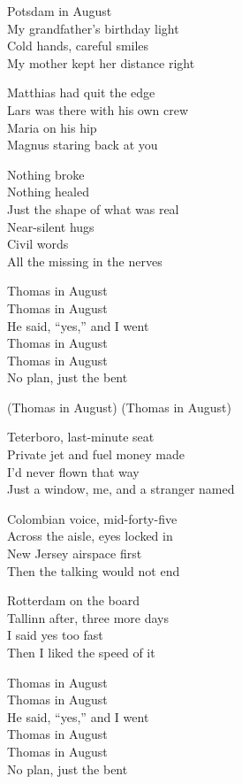 \begin{lyrics}
Potsdam in August\\
My grandfather’s birthday light\\
Cold hands, careful smiles\\
My mother kept her distance right

Matthias had quit the edge\\
Lars was there with his own crew\\
Maria on his hip\\
Magnus staring back at you

Nothing broke\\
Nothing healed\\
Just the shape of what was real\\
Near-silent hugs\\
Civil words\\
All the missing in the nerves

Thomas in August\\
Thomas in August\\
He said, “yes,” and I went\\
Thomas in August\\
Thomas in August\\
No plan, just the bent

(Thomas in August)
(Thomas in August)

Teterboro, last-minute seat\\
Private jet and fuel money made\\
I’d never flown that way\\
Just a window, me, and a stranger named

Colombian voice, mid-forty-five\\
Across the aisle, eyes locked in\\
New Jersey airspace first\\
Then the talking would not end

Rotterdam on the board\\
Tallinn after, three more days\\
I said yes too fast\\
Then I liked the speed of it

Thomas in August\\
Thomas in August\\
He said, “yes,” and I went\\
Thomas in August\\
Thomas in August\\
No plan, just the bent


\end{lyrics}
